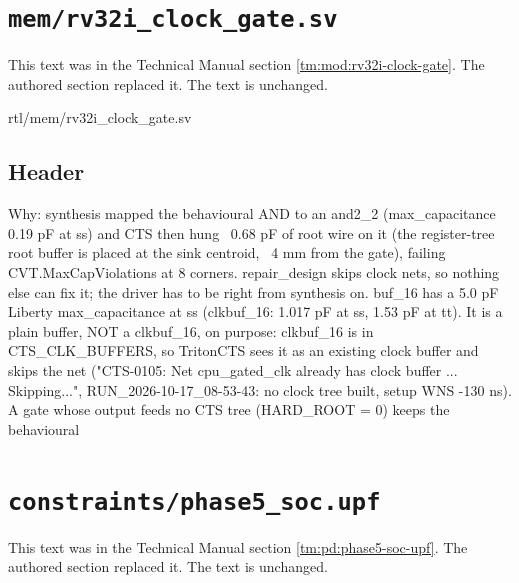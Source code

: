 \section{\texttt{mem/rv32i\_clock\_gate.sv}}\label{cr:arc:tm-rv32i-clock-gate}

This text was in the Technical Manual section \cref{tm:mod:rv32i-clock-gate}. The authored section replaced it. The text is unchanged.

\begin{relocated}{rtl/mem/rv32i_clock_gate.sv}

\subsection*{Header}

\begin{textblock}
Why: synthesis mapped the behavioural AND to an and2_2 (max_capacitance 0.19 pF at ss) and CTS then hung
~0.68 pF of root wire on it (the register-tree root buffer is placed at the sink centroid, ~4 mm from the
gate), failing CVT.MaxCapViolations at 8 corners. repair_design skips clock nets, so nothing else can fix
it; the driver has to be right from synthesis on. buf_16 has a 5.0 pF Liberty max_capacitance at ss (clkbuf_16: 1.017 pF
at ss, 1.53 pF at tt). It is a plain buffer, NOT a clkbuf_16, on purpose: clkbuf_16 is in CTS_CLK_BUFFERS, so TritonCTS
sees it as an existing clock buffer and skips the net ("CTS-0105: Net cpu_gated_clk already has clock buffer ...
Skipping...", RUN_2026-10-17_08-53-43: no clock tree built, setup WNS -130 ns). A gate whose output feeds no CTS tree (HARD_ROOT = 0) keeps the behavioural
\end{textblock}

\end{relocated}

\section{\texttt{constraints/phase5\_soc.upf}}\label{cr:arc:tm-phase5-soc-upf}

This text was in the Technical Manual section \cref{tm:pd:phase5-soc-upf}. The authored section replaced it. The text is unchanged.

